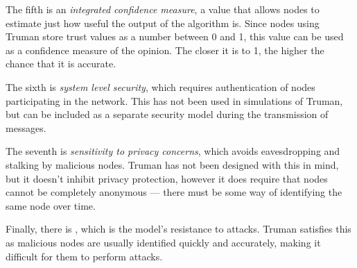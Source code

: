\documentclass[conference]{IEEEtran}
\begin{document}
The fifth is an \textit{integrated confidence measure}, a value that allows nodes to estimate just how useful the output of the algorithm is.
Since nodes using Truman store trust values as a number between 0 and 1, this value can be used as a confidence measure of the opinion.
The closer it is to 1, the higher the chance that it is accurate.

The sixth is \textit{system level security}, which requires authentication of nodes participating in the network.
This has not been used in simulations of Truman, but can be included as a separate security model during the transmission of messages.

The seventh is \textit{sensitivity to privacy concerns}, which avoids eavesdropping and stalking by malicious nodes.
Truman has not been designed with this in mind, but it doesn't inhibit privacy protection, however it does require that nodes cannot be completely anonymous --- there must be some way of identifying the same node over time.

Finally, there is , which is the model's resistance to attacks.
Truman satisfies this as malicious nodes are usually identified quickly and accurately, making it difficult for them to perform attacks.

%
\end{document}
